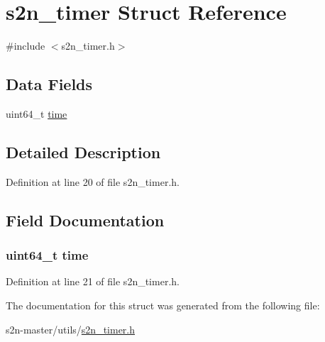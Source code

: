 \hypertarget{structs2n__timer}{}\section{s2n\+\_\+timer Struct Reference}
\label{structs2n__timer}


{\ttfamily \#include $<$s2n\+\_\+timer.\+h$>$}

\subsection*{Data Fields}
\begin{DoxyCompactItemize}
\item 
uint64\+\_\+t \hyperlink{structs2n__timer_a5d34a8f2dfe25421b2b473a5fd37b0ed}{time}
\end{DoxyCompactItemize}


\subsection{Detailed Description}


Definition at line 20 of file s2n\+\_\+timer.\+h.



\subsection{Field Documentation}
\subsubsection[{\texorpdfstring{time}{time}}]{\setlength{\rightskip}{0pt plus 5cm}uint64\+\_\+t time}\hypertarget{structs2n__timer_a5d34a8f2dfe25421b2b473a5fd37b0ed}{}\label{structs2n__timer_a5d34a8f2dfe25421b2b473a5fd37b0ed}


Definition at line 21 of file s2n\+\_\+timer.\+h.



The documentation for this struct was generated from the following file\+:\begin{DoxyCompactItemize}
\item 
s2n-\/master/utils/\hyperlink{s2n__timer_8h}{s2n\+\_\+timer.\+h}\end{DoxyCompactItemize}
